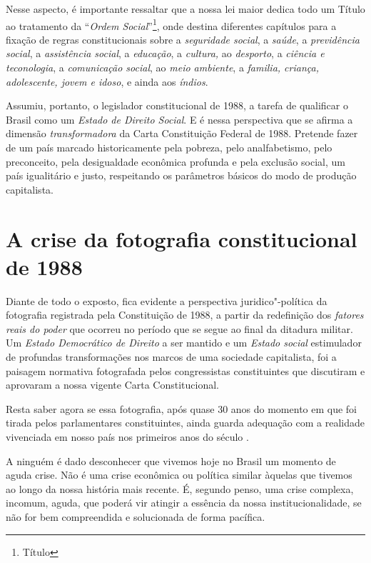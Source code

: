 Nesse aspecto, é importante ressaltar que a nossa lei maior dedica todo
um Título ao tratamento da ``\emph{Ordem Social}''\footnote{Título },
onde destina diferentes capítulos para a fixação de regras
constitucionais sobre a \emph{seguridade social}, a \emph{saúde}, a
\emph{previdência social}, a \emph{assistência social}, a
\emph{educação}, a \emph{cultura,} ao \emph{desporto}, a \emph{ciência e
teconologia}, a \emph{comunicação social}, ao \emph{meio ambiente}, a
\emph{familia, criança, adolescente, jovem e idoso}, e ainda aos
\emph{índios}.

Assumiu, portanto, o legislador constitucional de 1988, a tarefa de
qualificar o Brasil como um \emph{Estado de Direito Social}. E é nessa
perspectiva que se afirma a dimensão \emph{transformadora} da Carta
Constituição Federal de 1988. Pretende fazer de um país marcado
historicamente pela pobreza, pelo analfabetismo, pelo preconceito, pela
desigualdade econômica profunda e pela exclusão social, um país
igualitário e justo, respeitando os parâmetros básicos do modo de
produção capitalista.

\section{A crise da fotografia constitucional de 1988}

Diante de todo o exposto, fica evidente a perspectiva juridico"-política
da fotografia registrada pela Constituição de 1988, a partir da
redefinição dos \emph{fatores reais do poder} que ocorreu no período que
se segue ao final da ditadura militar. Um \emph{Estado Democrático de
Direito} a ser mantido e um \emph{Estado social} estimulador de
profundas transformações nos marcos de uma sociedade capitalista, foi a
paisagem normativa fotografada pelos congressistas constituintes que
discutiram e aprovaram a nossa vigente Carta Constitucional.

Resta saber agora se essa fotografia, após quase 30 anos do momento em
que foi tirada pelos parlamentares constituintes, ainda guarda adequação
com a realidade vivenciada em nosso país nos primeiros anos do século
.

A ninguém é dado desconhecer que vivemos hoje no Brasil um momento de
aguda crise. Não é uma crise econômica ou política similar àquelas que
tivemos ao longo da nossa história mais recente. É, segundo penso, uma
crise complexa, incomum, aguda, que poderá vir atingir a essência da
nossa institucionalidade, se não for bem compreendida e solucionada de
forma pacífica.

